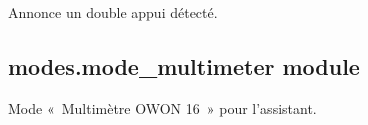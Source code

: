 \documentclass[letterpaper,10pt,french]{sphinxmanual}
\begin{document}
\begin{fulllineitems}
\begin{fulllineitems}
\end{fulllineitems}


\begin{fulllineitems}
\label{\detokenize{api/modes:modes.mode_dummy.ModeDummy.on_double_press}}
\pysigstartsignatures
\pysiglinewithargsret
{}
{}
{}
\pysigstopsignatures
\sphinxAtStartPar
Annonce un double appui détecté.

\end{fulllineitems}


\end{fulllineitems}



\subsection{modes.mode\_multimeter module}
\label{\detokenize{api/modes:module-modes.mode_multimeter}}\label{\detokenize{api/modes:modes-mode-multimeter-module}}
\sphinxAtStartPar
Mode « Multimètre OWON 16 » pour l’assistant.
\end{document}
